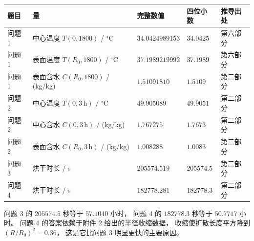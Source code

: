 \documentclass[12pt,a4paper]{article}
\begin{document}
\begin{center}
\small
\begin{tabular}{@{}lllll@{}}
\toprule
题目 & 量 & 完整数值 & 四位小数 & 推导出处 \\
\midrule
问题 1 & 中心温度 $T(0,1800)$ / $^\circ$C & $34.0424989153$ & $34.0425$ & 第六部分 \\
问题 1 & 表面温度 $T(R_0,1800)$ / $^\circ$C & $37.1989219992$ & $37.1989$ & 第六部分 \\
问题 1 & 表面含水 $C(R_0,1800)$ / (kg/kg) & $1.51091810$ & $1.5109$ & 第二部分 \\
问题 2 & 中心温度 $T(0,3\,\mathrm{h})$ / $^\circ$C & $49.905089$ & $49.9051$ & 第二部分 \\
问题 2 & 中心含水 $C(0,3\,\mathrm{h})$ / (kg/kg) & $1.767275$ & $1.7673$ & 第二部分 \\
问题 2 & 表面含水 $C(R_0,3\,\mathrm{h})$ / (kg/kg) & $1.008288$ & $1.0083$ & 第二部分 \\
问题 3 & 烘干时长 / s & $205574.519$ & $205574.5$ & 第二部分 \\
问题 4 & 烘干时长 / s & $182778.281$ & $182778.3$ & 第二部分 \\
\bottomrule
\end{tabular}
\end{center}

\noindent
问题 3 的 $205574.5$ 秒等于 $57.1040$ 小时，
问题 4 的 $182778.3$ 秒等于 $50.7717$ 小时。
问题 4 的答案依赖于附件 2 给出的半径收缩数据，
收缩使扩散长度平方降到 $(R/R_0)^2=0.36$，
这是它比问题 3 明显更快的主要原因。

\newpage
\tableofcontents
\newpage







\end{document}
